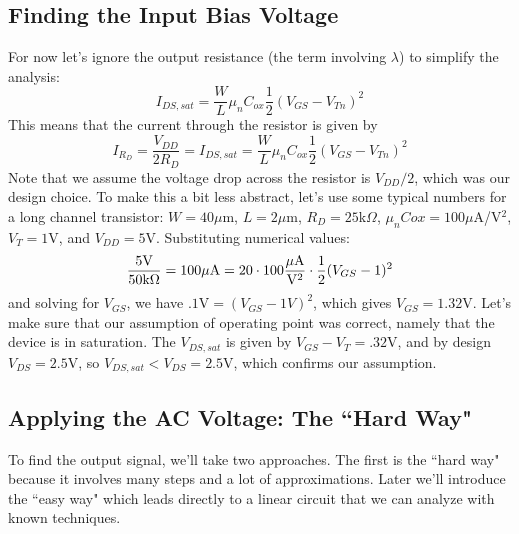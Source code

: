  \subsection{Finding the Input Bias Voltage}

For now let's ignore the output resistance (the term involving $\lambda$) to simplify the analysis:
%
\begin{equation}
	{I_{DS,sat}} = \frac{W}{L}{\mu _n}{C_{ox}}\frac{1}{2}{({V_{GS}} - {V_{Tn}})^2}
\end{equation}
%
This means that the current through the resistor is given by
%
\begin{equation}
	{I_{{R_D}}} = \frac{{{V_{DD}}}}{{2{R_D}}} = {I_{DS,sat}} = \frac{W}{L}{\mu _n}
	{C_{ox}}\frac{1}{2}{({V_{GS}} - {V_{Tn}})^2}
\end{equation}
%
Note that we assume the voltage drop across the resistor is $V_{DD}/2$, which was our design choice.  To make this a bit less abstract, let's use some typical numbers for a long channel transistor: $W=40\mu$m, $L = 2\mu$m,  $R_D = 25$k$\Omega$, $\mu_nCox = 100\mu$A/V$^2$, $V_T = 1$V, and $V_{DD} = 5$V.  Substituting numerical values:
%
\begin{equation}
	\frac{{5{\rm{V}}}}{{50{\rm{k}}\Omega }} = 100{\rm{\mu A}} = 20 \cdot 100\frac{{{\rm{\mu A}}}}{{{{\rm{V}}^2}}} \cdot \frac{1}{2}{({V_{GS}} - 1)^2}
\end{equation}
%
and solving for $V_{GS}$, we have $.1\mathrm{V} = {({V_{GS}} - 1V)^2}$, which gives ${V_{GS}} = 1.32$V.  Let's make sure that our assumption of operating point was correct, namely that the device is in saturation.  The $V_{DS,sat}$ is given by ${V_{GS}} - {V_T} = .32$V, and by design $V_{DS} = 2.5$V, so $V_{DS,sat} < {V_{DS}} = 2.5$V, which confirms our assumption.
 




\subsection{Applying the AC Voltage:  The ``Hard Way"}

To find the output signal, we'll take two approaches.  The first is the ``hard way" because it involves many steps and a lot of approximations.  Later we'll introduce the ``easy way" which leads directly to a linear circuit that we can analyze with known techniques.  
 

